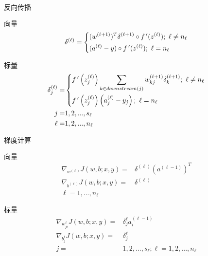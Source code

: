 \begin{frame}{反向传播}
\begin{block}{向量}
\[{\delta ^{(\ell)}} = \left\{ \begin{gathered}
  {({w^{(\ell + 1)}})^T}{\delta ^{(\ell + 1)}} \circ f\,'({z^{(\ell)}});{\text{  }}\ell \ne {n_\ell} \hfill \\
  ({a^{(\ell)}} - y) \circ f\,'({z^{(\ell)}}); {\text{  }}\ell = {n_\ell} \hfill \\ 
\end{gathered}  \right.\]
\end{block}

\begin{block}{标量}
\[\begin{aligned}
  \delta _j^{(\ell )} =  & \left\{ \begin{gathered}
  f\,'\left( {z_j^{(\ell )}} \right)\sum\limits_{k \in downstream(j)} {w_{kj}^{(\ell  + 1)}\delta _k^{(\ell  + 1)}} ;{\text{   }}\ell  \ne {n_\ell } \hfill \\
  f\,'\left( {z_j^{(\ell )}} \right)\left( {a_j^{(\ell )} - {y_j}} \right);{\text{                   }}\ell  = {n_\ell } \hfill \\ 
\end{gathered}  \right. \\ 
  j =  & 1,2,...,{s_\ell } \\ 
  \ell  =  & 1,2,...,{n_\ell } \\ 
\end{aligned} \]
\end{block}
\end{frame}

\begin{frame}{梯度计算}
\begin{block}{向量}
\[\begin{aligned}
  {\nabla _{{w^{(\ell )}}}}J(w,b;x,y) =  & {\delta ^{(\ell)}}{({a^{(\ell-1)}})^T} \\ 
  {\nabla _{{b^{(\ell )}}}}J(w,b;x,y) =  & {\delta ^{(\ell)}} \\ 
  \ell = 1, ..., n_{\ell}
\end{aligned} \]
\end{block}

\begin{block}{标量}
\[\begin{aligned}
  {\nabla _{w_{ji}^\ell }}J(w,b;x,y) =  & \delta _j^\ell a_i^{(\ell  - 1)} \\ 
  {\nabla _{b_j^\ell }}J(w,b;x,y) =  & \delta _j^\ell  \\ 
  j =  & 1,2,...,{s_\ell };   \ell = 1,2,...,{n_\ell } \\ 
\end{aligned} \]

\end{block}
\end{frame}


